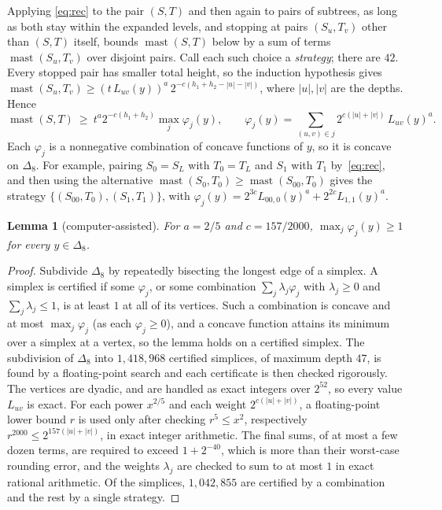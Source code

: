 \documentclass[11pt]{amsart}
\newtheorem{lemma}[theorem]{Lemma}
\theoremstyle{definition}
\newcommand{\mast}{\operatorname{mast}}
\begin{document}
Applying \eqref{eq:rec} to the pair $(S,T)$ and then again to pairs of subtrees, as long as both stay
within the expanded levels, and stopping at pairs $(S_u,T_v)$ other than $(S,T)$ itself, bounds
$\mast(S,T)$ below by a sum of terms $\mast(S_u,T_v)$ over disjoint pairs. Call each such choice a
\emph{strategy}; there are $42$. Every stopped pair has smaller total height, so the induction
hypothesis gives $\mast(S_u,T_v)\ge (t\,L_{uv}(y))^a\,2^{-c(h_1+h_2-|u|-|v|)}$, where $|u|,|v|$ are the
depths. Hence
\[
\mast(S,T)\ \ge\ t^a 2^{-c(h_1+h_2)}\max_j \varphi_j(y),\qquad
\varphi_j(y)=\sum_{(u,v)\in j} 2^{c(|u|+|v|)}\,L_{uv}(y)^a .
\]
Each $\varphi_j$ is a nonnegative combination of concave functions of $y$, so it is concave on
$\Delta_8$. For example, pairing $S_0=S_L$ with $T_0=T_L$ and $S_1$ with $T_1$ by~\eqref{eq:rec}, and then using the
alternative $\mast(S_0,T_0)\ge\mast(S_{00},T_0)$ gives the strategy $\{(S_{00},T_0),(S_1,T_1)\}$, with
$\varphi_j(y)=2^{3c}L_{00,0}(y)^a+2^{2c}L_{1,1}(y)^a$.

\begin{lemma}[computer-assisted]\label{lem:cert2}
For $a=2/5$ and $c=157/2000$, $\max_j\varphi_j(y)\ge1$ for every $y\in\Delta_8$.
\end{lemma}

\begin{proof}
Subdivide $\Delta_8$ by repeatedly bisecting the longest edge of a simplex. A simplex is certified if
some $\varphi_j$, or some combination $\sum_j\lambda_j\varphi_j$ with $\lambda_j\ge0$ and
$\sum_j\lambda_j\le1$, is at least $1$ at all of its vertices. Such a combination is concave and at most
$\max_j\varphi_j$ (as each $\varphi_j\ge0$), and a concave function attains its minimum over a simplex
at a vertex, so the lemma holds on a certified simplex. The subdivision of $\Delta_8$ into $1{,}418{,}968$
certified simplices, of maximum depth $47$, is found by a floating-point search and each certificate is
then checked rigorously. The vertices are dyadic, and are handled as exact integers over $2^{52}$, so
every value $L_{uv}$ is exact. For each power $x^{2/5}$ and each weight $2^{c(|u|+|v|)}$, a floating-point
lower bound $r$ is used only after checking $r^5\le x^2$, respectively
$r^{2000}\le 2^{157(|u|+|v|)}$, in exact integer arithmetic. The final sums, of at most a few dozen
terms, are required to exceed $1+2^{-40}$, which is more than their worst-case rounding error, and the
weights $\lambda_j$ are checked to sum to at most $1$ in exact rational arithmetic. Of the simplices,
$1{,}042{,}855$ are certified by a combination and the rest by a single strategy.
\end{proof}
\end{document}
